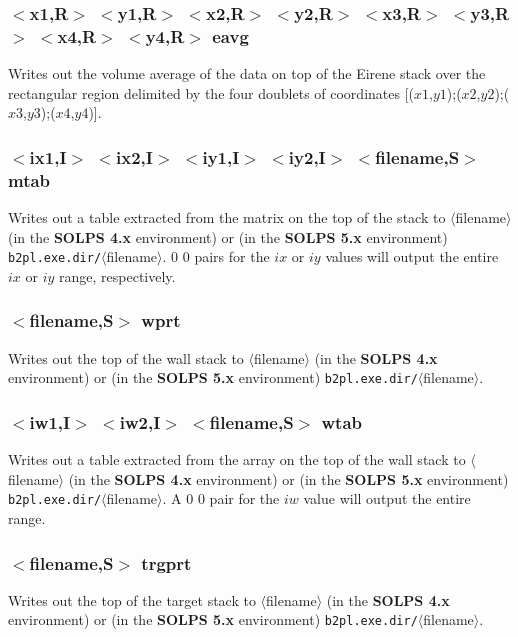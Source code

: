 \documentclass[a4paper,10pt]{report}
\newcommand\SOLPSfour{{\bf SOLPS 4.x} }
\newcommand\SOLPSfive{{\bf SOLPS 5.x} }
\begin{document}
\subsubsection{$<$x1,{\bf R}$>$ $<$y1,{\bf R}$>$ $<$x2,{\bf R}$>$ $<$y2,{\bf R}$>$ $<$x3,{\bf R}$>$ $<$y3,{\bf R}$>$ $<$x4,{\bf R}$>$ $<$y4,{\bf R}$>$ eavg}\label{sec:eavg}
Writes out the volume average of the data on top of the Eirene stack over the rectangular region delimited by the four doublets of coordinates [($x1$,$y1$);($x2$,$y2$);($x3$,$y3$);($x4$,$y4$)].

\subsubsection{$<$ix1,{\bf I}$>$ $<$ix2,{\bf I}$>$ $<$iy1,{\bf I}$>$ $<$iy2,{\bf I}$>$ $<$filename,{\bf S}$>$ mtab}\label{sec:mtab}
Writes out a table extracted from the matrix on the top of the stack to $\langle$filename$\rangle$ (in the \SOLPSfour environment)
or (in the \SOLPSfive environment) \verb:b2pl.exe.dir/:$\langle$filename$\rangle$. $0$ $0$ pairs for the $ix$ or $iy$ values will
output the entire $ix$ or $iy$ range, respectively.

\subsubsection{$<$filename,{\bf S}$>$ wprt}\label{sec:wprt}
Writes out the top of the wall stack to $\langle$filename$\rangle$ (in the \SOLPSfour environment)
or (in the \SOLPSfive environment) \verb:b2pl.exe.dir/:$\langle$filename$\rangle$.

\subsubsection{$<$iw1,{\bf I}$>$ $<$iw2,{\bf I}$>$ $<$filename,{\bf S}$>$ wtab}\label{sec:wtab}
Writes out a table extracted from the array on the top of the wall stack to $\langle$filename$\rangle$ (in the \SOLPSfour environment)
or (in the \SOLPSfive environment) \verb:b2pl.exe.dir/:$\langle$filename$\rangle$. A $0$ $0$ pair for the $iw$ value will
output the entire range.

\subsubsection{$<$filename,{\bf S}$>$ trgprt}\label{sec:trgprt}
Writes out the top of the target stack to $\langle$filename$\rangle$ (in the \SOLPSfour environment)
or (in the \SOLPSfive environment) \verb:b2pl.exe.dir/:$\langle$filename$\rangle$.
\end{document}
